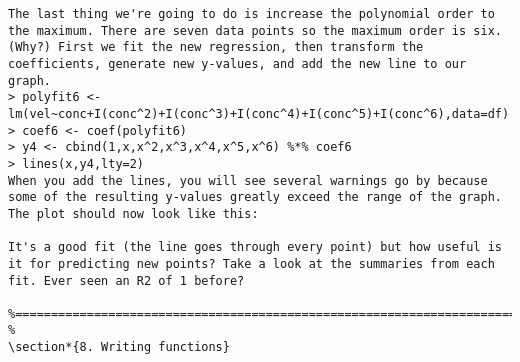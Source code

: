 {\begin{framed}
\begin{verbatim}
The last thing we're going to do is increase the polynomial order to the maximum. There are seven data points so the maximum order is six. (Why?) First we fit the new regression, then transform the coefficients, generate new y-values, and add the new line to our graph. 
> polyfit6 <- lm(vel~conc+I(conc^2)+I(conc^3)+I(conc^4)+I(conc^5)+I(conc^6),data=df)
> coef6 <- coef(polyfit6)
> y4 <- cbind(1,x,x^2,x^3,x^4,x^5,x^6) %*% coef6
> lines(x,y4,lty=2)
When you add the lines, you will see several warnings go by because some of the resulting y-values greatly exceed the range of the graph. The plot should now look like this: 

It's a good fit (the line goes through every point) but how useful is it for predicting new points? Take a look at the summaries from each fit. Ever seen an R2 of 1 before? 

%======================================================================================================== %
\section*{8. Writing functions}



\end{verbatim}
\end{framed}}
